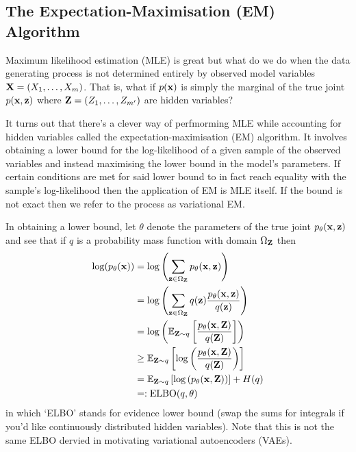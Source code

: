 \documentclass[11pt]{article}
\begin{document}
\begin{appendices}
\subsection{The Expectation-Maximisation (EM) Algorithm}
Maximum likelihood estimation (MLE) is great but what do we do when the data generating process is not determined entirely by observed model variables $\mathbf{X}=(X_1,\dots,X_m)$. That is, what if $p(\mathbf{x})$ is simply the marginal of the true joint $p(\mathbf{x},\mathbf{z})$ where $\mathbf{Z}=(Z_1,\dots,Z_{m'})$ are hidden variables?

It turns out that there's a clever way of perfmorming MLE while accounting for hidden variables called the expectation-maximisation (EM) algorithm. It involves obtaining a lower bound for the log-likelihood of a given sample of the observed variables and instead maximising the lower bound in the model's parameters. If certain conditions are met for said lower bound to in fact reach equality with the sample's log-likelihood then the application of EM is MLE itself. If the bound is not exact then we refer to the process as variational EM.

In obtaining a lower bound, let $\theta$ denote the parameters of the true joint $p_{\theta}(\mathbf{x},\mathbf{z})$ and see that if $q$ is a probability mass function with domain $\Omega_{\mathbf{Z}}$ then
\begin{align*}
    \log(p_{\theta}(\mathbf{x}))
    &=
    \log\left(\sum_{\mathbf{z}\in\Omega_{\mathbf{Z}}}p_{\theta}(\mathbf{x},\mathbf{z})\right)\\
    &=
    \log\left(\sum_{\mathbf{z}\in\Omega_{\mathbf{Z}}}q(\mathbf{z})\frac{p_{\theta}(\mathbf{x},\mathbf{z})}{q(\mathbf{z})}\right)\\
    &=
    \log\left(\mathbb{E}_{\mathbf{Z}\sim q}\left[\frac{p_{\theta}(\mathbf{x},\mathbf{Z})}{q(\mathbf{Z})}\right]\right)\\
    &\geq
    \mathbb{E}_{\mathbf{Z}\sim q}\left[\log\left(\frac{p_{\theta}(\mathbf{x},\mathbf{Z})}{q(\mathbf{Z})}\right)\right]\\
    &=
    \mathbb{E}_{\mathbf{Z}\sim q}\left[\log\left(p_{\theta}(\mathbf{x},\mathbf{Z})\right)\right]+H(q)\\
    &=:
    \text{ELBO}(q,\theta)
\end{align*}
in which `ELBO' stands for evidence lower bound (swap the sums for integrals if you'd like continuously distributed hidden variables). Note that this is not the same ELBO dervied in motivating variational autoencoders (VAEs).


\end{appendices}
\end{document}
